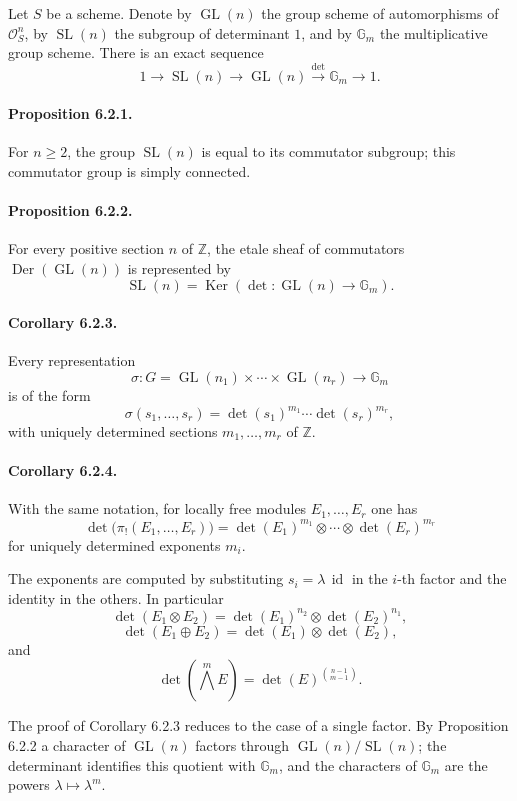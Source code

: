 \documentclass[12pt]{article}
\newcommand{\ZZ}{\mathbb Z}
\newcommand{\GG}{\mathbb G}
\newcommand{\cO}{\mathcal O}
\newcommand{\Ker}{\operatorname{Ker}}
\newcommand{\detm}{\det}
\newcommand{\Gl}{\operatorname{GL}}
\newcommand{\Sl}{\operatorname{SL}}
\newcommand{\Der}{\operatorname{Der}}
\newcommand{\xto}[1]{\xrightarrow{#1}}
\newcommand{\longto}{\longrightarrow}
\begin{document}
Let $S$ be a scheme. Denote by $\Gl(n)$ the group scheme of automorphisms of $\cO_S^n$, by $\Sl(n)$ the subgroup of determinant $1$, and by $\GG_m$ the multiplicative group scheme. There is an exact sequence
\[
1\longto\Sl(n)\longto\Gl(n)\xto{\detm}\GG_m\longto1.
\]

\paragraph{Proposition 6.2.1.}
For $n\geq2$, the group $\Sl(n)$ is equal to its commutator subgroup; this commutator group is simply connected.

\paragraph{Proposition 6.2.2.}
For every positive section $n$ of $\ZZ$, the etale sheaf of commutators $\Der(\Gl(n))$ is represented by
\[
\Sl(n)=\Ker(\detm:\Gl(n)\to\GG_m).
\]

\paragraph{Corollary 6.2.3.}
Every representation
\[
\sigma:G=\Gl(n_1)\times\cdots\times\Gl(n_r)\longto\GG_m
\]
is of the form
\[
\sigma(s_1,\ldots,s_r)=\detm(s_1)^{m_1}\cdots\detm(s_r)^{m_r},
\]
with uniquely determined sections $m_1,\ldots,m_r$ of $\ZZ$.

\paragraph{Corollary 6.2.4.}
With the same notation, for locally free modules $E_1,\ldots,E_r$ one has
\[
\detm\bigl(\pi_!(E_1,\ldots,E_r)\bigr)=
\detm(E_1)^{m_1}\otimes\cdots\otimes\detm(E_r)^{m_r}
\]
for uniquely determined exponents $m_i$.

The exponents are computed by substituting $s_i=\lambda\,\operatorname{id}$ in the $i$-th factor and the identity in the others. In particular
\[
\detm(E_1\otimes E_2)=\detm(E_1)^{n_2}\otimes\detm(E_2)^{n_1},
\]
\[
\detm(E_1\oplus E_2)=\detm(E_1)\otimes\detm(E_2),
\]
and
\[
\detm(\bigwedge^m E)=\detm(E)^{{n-1\choose m-1}}.
\]

The proof of Corollary 6.2.3 reduces to the case of a single factor. By Proposition 6.2.2 a character of $\Gl(n)$ factors through $\Gl(n)/\Sl(n)$; the determinant identifies this quotient with $\GG_m$, and the characters of $\GG_m$ are the powers $\lambda\mapsto\lambda^m$.
\end{document}
